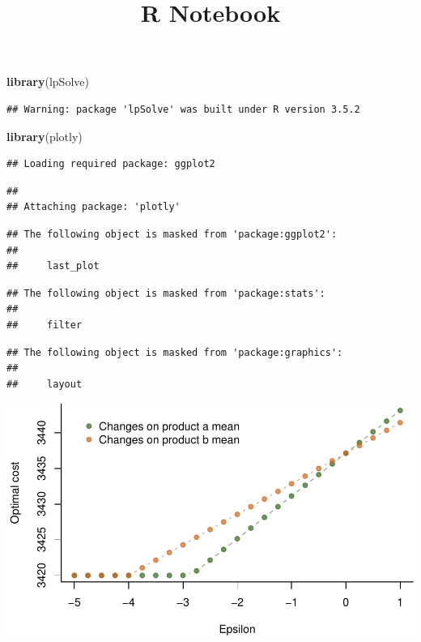 \documentclass[
]{article}
\title{R Notebook}
\author{}
\date{\vspace{-2.5em}}
\newenvironment{Shaded}{\begin{snugshade}}{\end{snugshade}}
\newcommand{\DataTypeTok}[1]{\textcolor[rgb]{0.13,0.29,0.53}{#1}}
\newcommand{\KeywordTok}[1]{\textcolor[rgb]{0.13,0.29,0.53}{\textbf{#1}}}
\newcommand{\NormalTok}[1]{#1}
\newcommand{\OperatorTok}[1]{\textcolor[rgb]{0.81,0.36,0.00}{\textbf{#1}}}
\newcommand{\OtherTok}[1]{\textcolor[rgb]{0.56,0.35,0.01}{#1}}
\begin{document}
\maketitle

\begin{Shaded}
\begin{Highlighting}[]
\KeywordTok{library}\NormalTok{(lpSolve)}
\end{Highlighting}
\end{Shaded}

\begin{verbatim}
## Warning: package 'lpSolve' was built under R version 3.5.2
\end{verbatim}

\begin{Shaded}
\begin{Highlighting}[]
\KeywordTok{library}\NormalTok{(plotly)}
\end{Highlighting}
\end{Shaded}

\begin{verbatim}
## Loading required package: ggplot2
\end{verbatim}

\begin{verbatim}
## 
## Attaching package: 'plotly'
\end{verbatim}

\begin{verbatim}
## The following object is masked from 'package:ggplot2':
## 
##     last_plot
\end{verbatim}

\begin{verbatim}
## The following object is masked from 'package:stats':
## 
##     filter
\end{verbatim}

\begin{verbatim}
## The following object is masked from 'package:graphics':
## 
##     layout
\end{verbatim}

\begin{Shaded}
\end{Shaded}

\includegraphics{Example-figure_files/figure-latex/mean-1.pdf}
\end{document}
